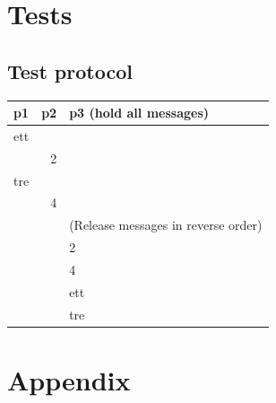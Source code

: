 \documentclass[titlepage, twocolumn, a4paper, 10pt]{article}
\begin{document}
\section{Tests}\label{sec:tests}




\subsection{Test protocol}\label{sec:test-protocol}

\begin{tabular}{lrl}
p1 & p2 & p3 (hold all messages) \\
\hline
ett &  &  \\
 & 2 &  \\
tre &  &  \\
 & 4 &  \\
\hline
 &  & (Release messages in reverse order) \\
\hline
 &  & 2 \\
 &  & 4 \\
 &  & ett \\
 &  & tre \\
\end{tabular}

\newpage
\appendix
{}
\section{Appendix}\label{sec:kallkod}
\end{document}
